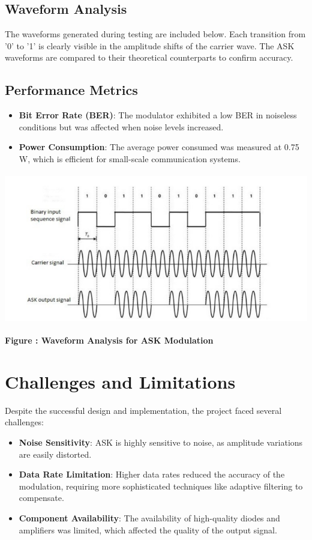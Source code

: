 \documentclass[12pt,a4paper]{article}
\begin{document}
\subsection*{Waveform Analysis}
The waveforms generated during testing are included below. Each transition from '0' to '1' is clearly visible in the amplitude shifts of the carrier wave. The ASK waveforms are compared to their theoretical counterparts to confirm accuracy.

\subsection*{Performance Metrics}
\begin{itemize}
    \item \textbf{Bit Error Rate (BER)}: The modulator exhibited a low BER in noiseless conditions but was affected when noise levels increased.
    \item \textbf{Power Consumption}: The average power consumed was measured at 0.75 W, which is efficient for small-scale communication systems.
\end{itemize}

\begin{center}
    {\includegraphics[width=550px, height=250px]{waveform.png}}
    \parbox{0.8\textwidth}{ 
        \centering
        \textbf{Figure : Waveform Analysis for ASK Modulation}
    }
\end{center}

\section*{Challenges and Limitations}
Despite the successful design and implementation, the project faced several challenges:
\begin{itemize}
    \item \textbf{Noise Sensitivity}: ASK is highly sensitive to noise, as amplitude variations are easily distorted.
    \item \textbf{Data Rate Limitation}: Higher data rates reduced the accuracy of the modulation, requiring more sophisticated techniques like adaptive filtering to compensate.
    \item \textbf{Component Availability}: The availability of high-quality diodes and amplifiers was limited, which affected the quality of the output signal.
\end{itemize}
\end{document}
